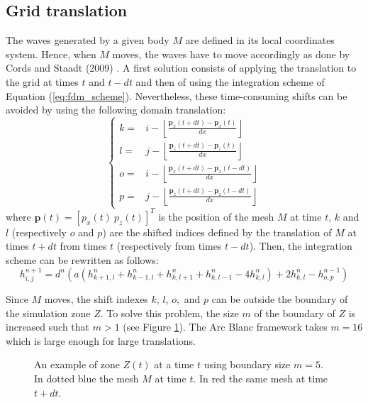 \documentclass[final]{jcgt}
\def\Framework{The Arc Blanc framework\xspace}
\begin{document}
\subsection{Grid translation}
\label{subsec:gridTranslation}
The waves generated by a given body $M$ are defined in its local coordinates system.
Hence, when $M$ moves, the waves have to move accordingly as done by Cords and Staadt (2009) \cite{cordsRealTimeOpenWater2009}.
A first solution consists of applying the translation to the grid at times $t$ and $t-dt$ and then of using the integration scheme of Equation (\ref{eq:fdm_scheme}).
Nevertheless, these time-consuming shifts can be avoided by using the following domain translation:
\begin{equation}
	\begin{cases}
		k = & i - \left\lfloor\frac{\mathbf{p}_x(t+dt)-\mathbf{p}_x(t)}{dx}\right\rfloor    \\
		l = & j - \left\lfloor\frac{\mathbf{p}_z(t+dt)-\mathbf{p}_z(t)}{dx}\right\rfloor    \\
		o = & i - \left\lfloor\frac{\mathbf{p}_x(t+dt)-\mathbf{p}_x(t-dt)}{dx}\right\rfloor \\
		p = & j - \left\lfloor\frac{\mathbf{p}_z(t+dt)-\mathbf{p}_z(t-dt)}{dx}\right\rfloor
	\end{cases}
\end{equation}
where $\mathbf p(t)=\left[p_x(t)\ p_z(t)\right]^T$ is the position of the mesh $M$ at time $t$, $k$ and $l$ (respectively $o$ and $p$) are the shifted indices defined by the translation of $M$ at times $t+dt$ from times $t$ (respectively from times $t-dt$).
Then, the integration scheme can be rewritten as follows:
\begin{equation}
	\label{eq:fdm_scheme_corrected}
	h_{i,j}^{n+1} = d^n\left(a\left(h_{k+1,l}^n+h_{k-1,l}^n+h_{k,l+1}^n+h_{k,l-1}^n- 4 h_{k,l}^n\right) + 2 h_{k,l}^n - h_{o,p}^{n-1}\right)
\end{equation}

Since $M$ moves, the shift indexes $k$, $l$, $o,$ and $p$ can be outside the boundary of the simulation zone $Z$.
To solve this problem, the size $m$ of the boundary of $Z$ is increased such that $m>1$ (see Figure \ref{fig:examGrid}).
\Framework takes $m=16$ which is large enough for large translations.

\begin{figure}[!h]
	\centering
	
	\caption{An example of zone $Z(t)$ at a time $t$ using boundary size $m=5$.
		In \textcolor{bleuF}{dotted blue} the mesh ${M}$ at time $t$.
		In \textcolor{redF}{red} the same mesh at time $t+dt$.}
	\label{fig:examGrid}
\end{figure}
\end{document}
